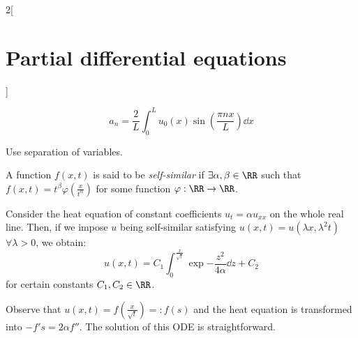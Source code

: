 \documentclass[../../../main_math.tex]{subfiles}
\begin{document}
\begin{multicols}{2}[\section{Partial differential equations}]
\begin{proposition}
\begin{equation*}
      a_n =\frac{2}{L}\int_{0}^Lu_0(x)\sin\left(\frac{\pi n x}{L}\right)\dd{x}
    \end{equation*}
  \end{proposition}
  \begin{sproof}
    Use separation of variables.
  \end{sproof}
  \begin{definition}
    A function $f(x,t)$ is said to be \emph{self-similar} if $\exists \alpha,\beta\in\RR$ such that $f(x,t)=t^\beta\varphi\left(\frac{x}{t^\alpha}\right)$ for some function $\varphi:\RR\rightarrow\RR$.
  \end{definition}
  \begin{proposition}
    Consider the heat equation of constant coefficients $ u_{t} =\alpha u_{xx}$ on the whole real line. Then, if we impose $u$ being self-similar satisfying $u(x,t)=u(\lambda x,\lambda^2t)$ $\forall\lambda>0$, we obtain:
    \begin{equation}\label{PDE:selfsimilarsol}
      u(x,t)=C_1\int_0^{\frac{x}{\sqrt{t}}}\exp{-\frac{z^2}{4\alpha}}\dd{z} +C_2
    \end{equation}
    for certain constants $C_1, C_2\in\RR$.
  \end{proposition}
  \begin{sproof}
    Observe that $u(x,t) = f(\frac{x}{\sqrt{t}})=:f(s)$ and the heat equation is transformed into $-f's=2\alpha f''$. The solution of this ODE is straightforward.
  \end{sproof}

\end{multicols}
\end{document}
